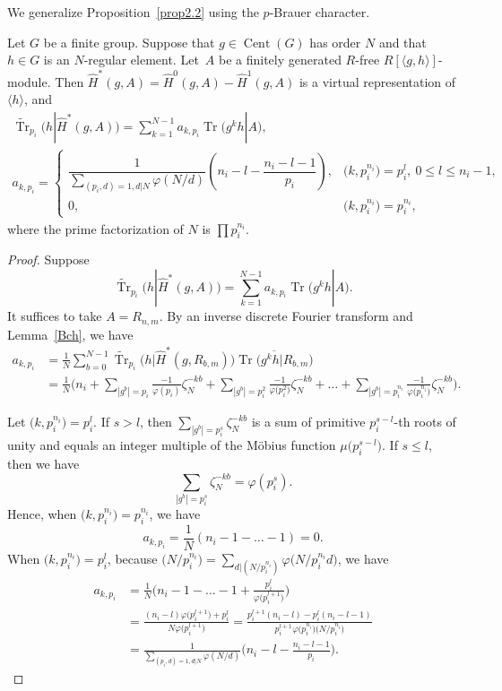 We generalize Proposition~\ref{prop2.2} \cite[Proposition~2.2]{BR} using the $p$-Brauer character.

\begin{Theorem} \label{2.2kai}
Let $G$ be a finite group. Suppose that $g \in \operatorname{Cent}(G)$ has order $N$ and that $h \in G$ is an $N$-regular element. Let~$A$ be a finitely generated $R$-free $R[\langle g,h \rangle]$-module. Then $\hat{H}^*(g,A)=\hat{H}^0(g,A)-\hat{H}^1(g,A)$ is a virtual representation of $\langle h \rangle$, and
\begin{gather*}
\widetilde{\operatorname{Tr}}_{p_i}(h|\hat{H}^*(g,A))=\sum_{k=1}^{N-1}a_{k,p_i}\operatorname{Tr}\big(g^kh|A\big) ,
\\
a_{k,p_i}=\begin{cases}
\dfrac{1}{\sum_{(p_i,d)=1,d|N}\varphi (N/d)}\left(n_i-l-\dfrac{n_i-l-1}{p_i}\right), & \big(k,p_i^{n_i}\big)=p_i^l, \ 0\leq l \leq n_i-1, \\
0, & \big(k,p_i^{n_i}\big)=p_i^{n_i},
\end{cases}
\end{gather*}
where the prime factorization of $N$ is $\prod p_i^{n_i}$.
\end{Theorem}

\begin{proof}
Suppose
\[
\widetilde{\operatorname{Tr}}_{p_i}\big(h|\hat{H}^*(g,A)\big)=\sum_{k=1}^{N-1}a_{k,p_i}\operatorname{Tr}\big(g^kh|A\big). \]
It suffices to take $A=R_{n,m}$.
By an inverse discrete Fourier transform and Lemma~\ref{Bch}, we have
\begin{align*}
a_{k,p_i}&=\frac{1}{N}\sum_{b=0}^{N-1}\widetilde{\operatorname{Tr}}_{p_i}\big(h|\hat{H}^*(g,R_{b,m})\big)\overline{\operatorname{Tr}\big(g^kh|R_{b,m}\big)} \\
 &=\frac{1}{N}\Bigg(n_i+\sum_{|g^b|=p_i} \frac{-1}{\varphi (p_i)}\zeta_N^{-kb}+\sum_{ |g^b|=p_i^2} \frac{-1}{\varphi \big(p_i^2\big)}\zeta_N^{-kb}+\dots+\sum_{|g^b|=p_i^{n_i}} \frac{-1}{\varphi \big(p_i^{n_i}\big)}\zeta_N^{-kb}\Bigg).
\end{align*}

Let $\big(k,p_i^{n_i}\big)=p_i^l$. If $s>l$, then $\sum_{|g^b|=p_i^s}\zeta_N^{-kb}$ is a sum of primitive $p_i^{s-l}$-th roots of unity and equals an integer multiple of the M\"obius function $\mu\big(p_i^{s-l}\big)$. If $s\leq l$, then we have
\[
\sum_{|g^b|=p_i^s}\zeta_N^{-kb}=\varphi(p_i^s).
\]
Hence, when $\big(k,p_i^{n_i}\big)=p_i^{n_i}$, we have 
\[ a_{k,p_i}=\frac{1}{N}(n_i-1-\dots-1)=0.\]
When $\big(k,p_i^{n_i}\big)=p_i^{l}$, because $\big(N/p_i^{n_i}\big)=\sum_{d|(N/p_i^{n_i})}\varphi\big(N/p_i^{n_i}d\big)$, we have
\begin{align*}
a_{k,p_i}&=\frac{1}{N}\Bigg(n_i-1-\dots-1+\frac{p_i^l}{\varphi \big(p_i^{l+1}\big)}\Bigg)\\
 &=\frac{(n_i-l)\varphi \big(p_i^{l+1}\big)+p_i^l}{N\varphi \big(p_i^{l+1}\big)} =\frac{p_i^{l+1}(n_i-l)-p_i^l(n_i-l-1)}{p_i^{l+1}\varphi\big(p_i^{n_i}\big)\big(N/p_i^{n_i}\big)}\\
 &=\frac{1}{\sum_{(p_i,d)=1,d|N}\varphi (N/d)}\bigg(n_i-l-\frac{n_i-l-1}{p_i}\bigg).\tag*{\qed}
\end{align*}\renewcommand{\qed}{}
\end{proof}
